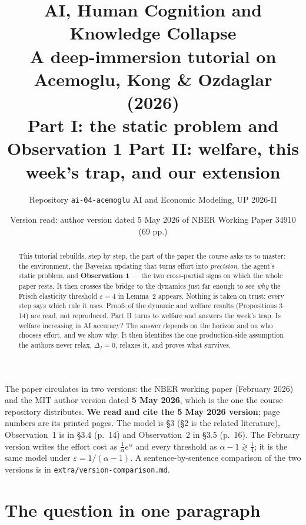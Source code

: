 \documentclass[11pt,a4paper]{article}
\title{\textbf{AI, Human Cognition and Knowledge Collapse}\\[2pt]
\large A deep-immersion tutorial on Acemoglu, Kong \& Ozdaglar (2026)\\
\normalsize Part I: the static problem and Observation 1 \textperiodcentered{} Part II: welfare, this week's trap, and our extension}
\author{Repository \texttt{ai-04-acemoglu} \textperiodcentered{} AI and Economic Modeling, UP 2026-II}
\date{Version read: author version dated 5 May 2026 of NBER Working Paper 34910 (69 pp.)}
\theoremstyle{definition}
\theoremstyle{remark}
\begin{document}
\maketitle

\begin{abstract}
\noindent This tutorial rebuilds, step by step, the part of the paper the course asks us to master: the
environment, the Bayesian updating that turns effort into \emph{precision}, the agent's static problem, and
\textbf{Observation 1} --- the two cross-partial signs on which the whole paper rests. It then crosses the
bridge to the dynamics just far enough to see \emph{why} the Frisch elasticity threshold $\varepsilon=4$ in
Lemma~2 appears. Nothing is taken on trust: every step says which rule it uses. Proofs of the
dynamic and welfare results (Propositions 3--14) are read, not reproduced.
Part II turns to welfare and answers the week's trap. Is welfare increasing in AI accuracy? The answer
depends on the horizon and on who chooses effort, and we show why. It then identifies the one
production-side assumption the authors never relax, $\Delta_I=0$, relaxes it, and proves what survives.
\end{abstract}

\begin{warnbox}
The paper circulates in two versions: the NBER working paper (February 2026) and the MIT author
version dated \textbf{5 May 2026}, which is the one the course repository distributes. \textbf{We read and
cite the 5 May 2026 version}; page numbers are its printed pages. The model is \S3 (\S2 is the related
literature), Observation~1 is in \S3.4 (p.~14) and Observation~2 in \S3.5 (p.~16). The February version
writes the effort cost as $\frac1\alpha e^\alpha$ and every threshold as $\alpha-1\gtrless\frac14$; it is the
same model under $\varepsilon=1/(\alpha-1)$. A sentence-by-sentence comparison of the two versions is in
\texttt{extra/version-comparison.md}.
\end{warnbox}

\tableofcontents

\section{The question in one paragraph}
\end{document}
